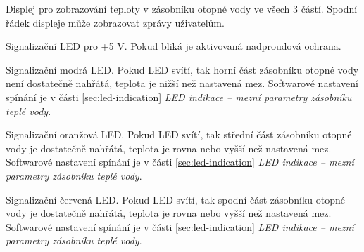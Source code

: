 \begin{Czech}
Displej pro zobrazování teploty v zásobníku otopné vody ve všech 3 částí. Spodní řádek displeje může zobrazovat zprávy uživatelům.
\end{Czech}

\begin{Czech}
Signalizační LED pro +5 V. Pokud bliká je aktivovaná nadproudová ochrana.
\end{Czech}

\newpage
\begin{Czech}
Signalizační modrá LED. Pokud LED svítí, tak horní část zásobníku otopné vody není dostatečně nahřátá, teplota je nižší než nastavená mez. Softwarové nastavení spínání je v části \ref{sec:led-indication} \textit{LED indikace – mezní parametry zásobníku teplé vody}.
\end{Czech}

\begin{Czech}
Signalizační oranžová LED. Pokud LED svítí, tak střední část zásobníku otopné vody je dostatečně nahřátá, teplota je rovna nebo vyšší než nastavená mez. Softwarové nastavení spínání je v části \ref{sec:led-indication} \textit{LED indikace – mezní parametry zásobníku teplé vody}.
\end{Czech}

\begin{Czech}
Signalizační červená LED. Pokud LED svítí, tak spodní část zásobníku otopné vody je dostatečně nahřátá, teplota je rovna nebo vyšší než nastavená mez. Softwarové nastavení spínání je v části \ref{sec:led-indication} \textit{LED indikace – mezní parametry zásobníku teplé vody}.
\end{Czech}

